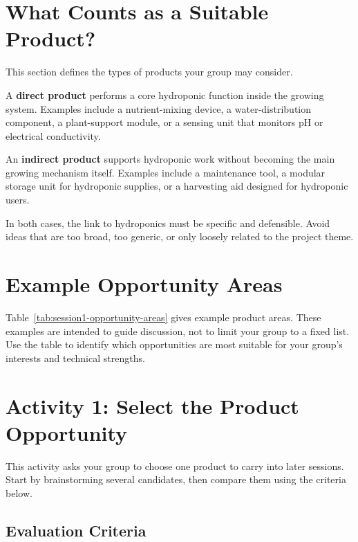 \section{What Counts as a Suitable Product?}

This section defines the types of products your group may consider.

A \textbf{direct product} performs a core hydroponic function inside the growing system. Examples include a nutrient-mixing device, a water-distribution component, a plant-support module, or a sensing unit that monitors pH or electrical conductivity.

An \textbf{indirect product} supports hydroponic work without becoming the main growing mechanism itself. Examples include a maintenance tool, a modular storage unit for hydroponic supplies, or a harvesting aid designed for hydroponic users.

In both cases, the link to hydroponics must be specific and defensible. Avoid ideas that are too broad, too generic, or only loosely related to the project theme.

\section{Example Opportunity Areas}

Table~\ref{tab:session1-opportunity-areas} gives example product areas. These examples are intended to guide discussion, not to limit your group to a fixed list. Use the table to identify which opportunities are most suitable for your group's interests and technical strengths.


\section{Activity 1: Select the Product Opportunity}

This activity asks your group to choose one product to carry into later sessions. Start by brainstorming several candidates, then compare them using the criteria below.

\subsection{Evaluation Criteria}

